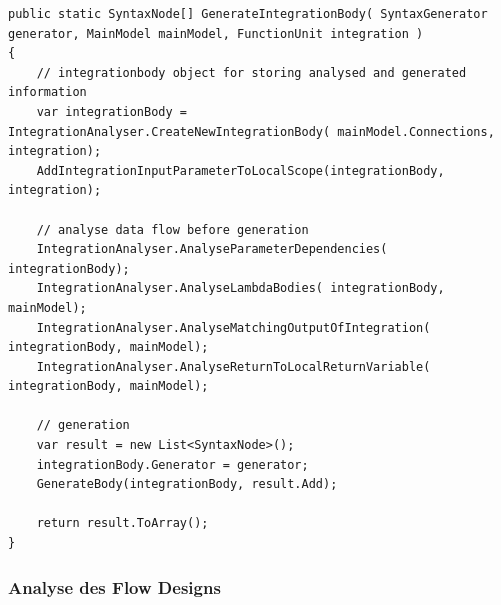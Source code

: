 	\begin{lstlisting}[caption=GenerateIntegrationBody Methode]
public static SyntaxNode[] GenerateIntegrationBody( SyntaxGenerator generator, MainModel mainModel, FunctionUnit integration )
{
	// integrationbody object for storing analysed and generated information
	var integrationBody = IntegrationAnalyser.CreateNewIntegrationBody( mainModel.Connections, integration);
	AddIntegrationInputParameterToLocalScope(integrationBody, integration);
	
	// analyse data flow before generation 
	IntegrationAnalyser.AnalyseParameterDependencies( integrationBody);
	IntegrationAnalyser.AnalyseLambdaBodies( integrationBody, mainModel);
	IntegrationAnalyser.AnalyseMatchingOutputOfIntegration( integrationBody, mainModel);
	IntegrationAnalyser.AnalyseReturnToLocalReturnVariable( integrationBody, mainModel);
	
	// generation
	var result = new List<SyntaxNode>();
	integrationBody.Generator = generator;
	GenerateBody(integrationBody, result.Add);
	
	return result.ToArray();
}
	\end{lstlisting}
	
	\subsubsection{Analyse des Flow Designs}

